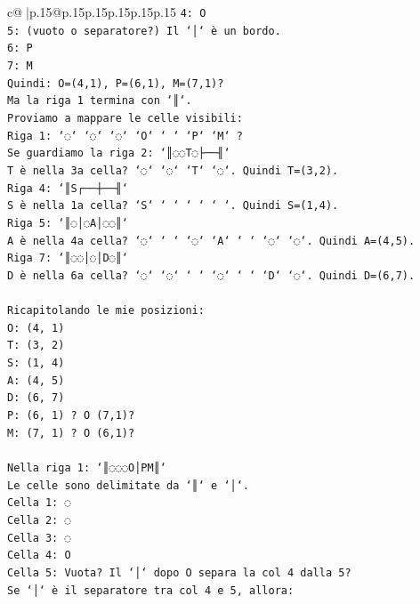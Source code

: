 \documentclass{article}
\begin{document}
{\begin{supertabular}{c@{$\;$}|p{.15\linewidth}@{}p{.15\linewidth}p{.15\linewidth}p{.15\linewidth}p{.15\linewidth}p{.15\linewidth}}
{{{\texttt{4: O} \\
\texttt{5: (vuoto o separatore?) Il `│` è un bordo.} \\
\texttt{6: P} \\
\texttt{7: M} \\
\texttt{Quindi: O=(4,1), P=(6,1), M=(7,1)?} \\
\texttt{Ma la riga 1 termina con `║`.} \\
\texttt{Proviamo a mappare le celle visibili:} \\
\texttt{Riga 1: `◌` `◌` `◌` `O` ` ` `P` `M` ?} \\
\texttt{Se guardiamo la riga 2: `║◌◌T◌├──╢`} \\
\texttt{T è nella 3a cella? `◌` `◌` `T` `◌`. Quindi T=(3,2).} \\
\texttt{Riga 4: `║S┌──┼──╢`} \\
\texttt{S è nella 1a cella? `S` ` ` ` ` ` `. Quindi S=(1,4).} \\
\texttt{Riga 5: `║◌│◌A│◌◌║`} \\
\texttt{A è nella 4a cella? `◌` ` ` `◌` `A` ` ` `◌` `◌`. Quindi A=(4,5).} \\
\texttt{Riga 7: `║◌◌│◌│D◌║`} \\
\texttt{D è nella 6a cella? `◌` `◌` ` ` `◌` ` ` `D` `◌`. Quindi D=(6,7).} \\
\\ 
\texttt{Ricapitolando le mie posizioni:} \\
\texttt{O: (4, 1)} \\
\texttt{T: (3, 2)} \\
\texttt{S: (1, 4)} \\
\texttt{A: (4, 5)} \\
\texttt{D: (6, 7)} \\
\texttt{P: (6, 1) ? O (7,1)?} \\
\texttt{M: (7, 1) ? O (6,1)?} \\
\\ 
\texttt{Nella riga 1: `║◌◌◌O│PM║`} \\
\texttt{Le celle sono delimitate da `║` e `│`.} \\
\texttt{Cella 1: ◌} \\
\texttt{Cella 2: ◌} \\
\texttt{Cella 3: ◌} \\
\texttt{Cella 4: O} \\
\texttt{Cella 5: Vuota? Il `│` dopo O separa la col 4 dalla 5?} \\
\texttt{Se `│` è il separatore tra col 4 e 5, allora:} \\
}}}
\end{supertabular}}
\end{document}
